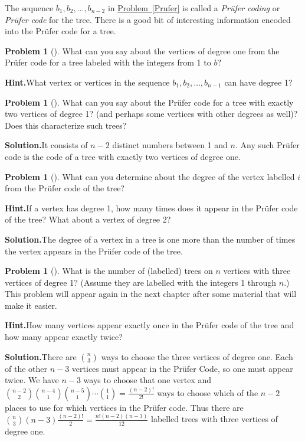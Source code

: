 \documentclass[10pt,]{book}
\theoremstyle{plain}
\theoremstyle{definition}
\newtheorem{activity}[project]{Problem}
\theoremstyle{definition}
\numberwithin{equation}{chapter}
\begin{document}
The sequence \(b_1,b_2,\ldots, b_{n-2}\) in \hyperref[Prufer]{Problem~\ref{Prufer}} is called a \emph{Prüfer coding} or \emph{Prüfer code} for the tree. There is a good bit of interesting information encoded into the Prüfer code for a tree.%
\begin{activity}[]\label{activity-113}
What can you say about the vertices of degree one from the Prüfer code for a tree labeled with the integers from 1 to \(b\)?%
\par\medskip\noindent%
\textbf{Hint.}\quad What vertex or vertices in the sequence \(b_1,b_2,\ldots,b_{n-1}\) can have degree 1?%
\end{activity}
\begin{activity}[]\label{activity-114}
What can you say about the Prüfer code for a tree with exactly two vertices of degree 1? (and perhaps some vertices with other degrees as well)? Does this characterize such trees?%
\par\medskip\noindent%
\textbf{Solution.}\quad It consists of \(n-2\) distinct numbers between 1 and \(n\). Any such Prüfer code is the code of a tree with exactly two vertices of degree one.%
\end{activity}
\begin{activity}[]\label{activity-115}
What can you determine about the degree of the vertex labelled \(i\) from the Prüfer code of the tree?%
\par\medskip\noindent%
\textbf{Hint.}\quad If a vertex has degree 1, how many times does it appear in the Prüfer code of the tree? What about a vertex of degree 2?%
\par\medskip\noindent%
\textbf{Solution.}\quad The degree of a vertex in a tree is one more than the number of times the vertex appears in the Prüfer code of the tree.%
\end{activity}
\begin{activity}[]\label{activity-116}
What is the number of (labelled) trees on \(n\) vertices with three vertices of degree 1? (Assume they are labelled with the integers 1 through \(n\).) This problem will appear again in the next chapter after some material that will make it easier.%
\par\medskip\noindent%
\textbf{Hint.}\quad How many vertices appear exactly once in the Prüfer code of the tree and how many appear exactly twice?%
\par\medskip\noindent%
\textbf{Solution.}\quad There are \(\binom{n}{3}\) ways to choose the three vertices of degree one. Each of the other \(n-3\) vertices must appear in the Prüfer Code, so one must appear twice. We have \(n-3\) ways to choose that one vertex and \(\binom{n-2}{2}\binom{n-4}{1}\binom{n-5}{1}\cdots\binom{1}{1} =\frac{(n-2)!}{2!}\) ways to choose which of the \(n-2\) places to use for which vertices in the Prüfer code. Thus there are \(\binom{n}{3}(n-3)\frac{(n-2)!}{2}= \frac{n!(n-2)(n-3)}{12}\) labelled trees with three vertices of degree one.%
\end{activity}
\typeout{************************************************}
\typeout{************************************************}
\end{document}
